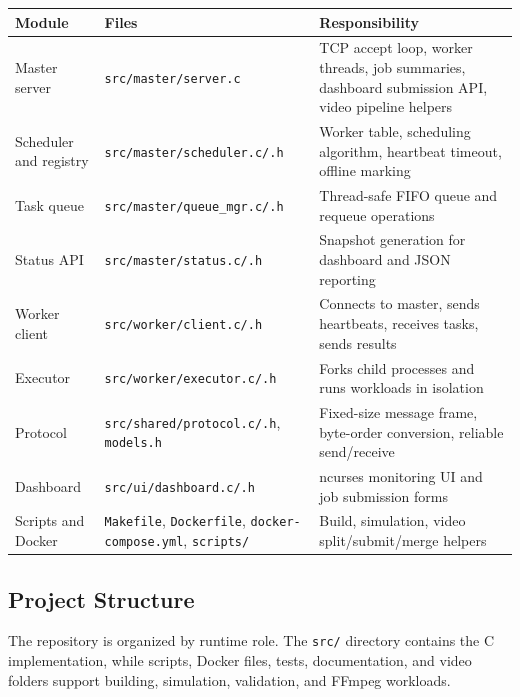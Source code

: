 \documentclass[12pt,a4paper]{article}
\begin{document}
\begin{center}
\begin{tabular}{p{3.6cm}p{5.2cm}p{5.2cm}}
\toprule
\textbf{Module} & \textbf{Files} & \textbf{Responsibility} \\
\midrule
Master server & \texttt{src/master/server.c} & TCP accept loop, worker threads, job summaries, dashboard submission API, video pipeline helpers \\
Scheduler and registry & \texttt{src/master/scheduler.c/.h} & Worker table, scheduling algorithm, heartbeat timeout, offline marking \\
Task queue & \texttt{src/master/queue\_mgr.c/.h} & Thread-safe FIFO queue and requeue operations \\
Status API & \texttt{src/master/status.c/.h} & Snapshot generation for dashboard and JSON reporting \\
Worker client & \texttt{src/worker/client.c/.h} & Connects to master, sends heartbeats, receives tasks, sends results \\
Executor & \texttt{src/worker/executor.c/.h} & Forks child processes and runs workloads in isolation \\
Protocol & \texttt{src/shared/protocol.c/.h}, \texttt{models.h} & Fixed-size message frame, byte-order conversion, reliable send/receive \\
Dashboard & \texttt{src/ui/dashboard.c/.h} & ncurses monitoring UI and job submission forms \\
Scripts and Docker & \texttt{Makefile}, \texttt{Dockerfile}, \texttt{docker-compose.yml}, \texttt{scripts/} & Build, simulation, video split/submit/merge helpers \\
\bottomrule
\end{tabular}
\end{center}

\subsection{Project Structure}

The repository is organized by runtime role. The \texttt{src/} directory contains the C implementation, while scripts, Docker files, tests, documentation, and video folders support building, simulation, validation, and FFmpeg workloads.
\end{document}

